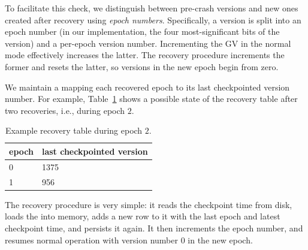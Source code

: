 To facilitate this check, we distinguish between pre-crash versions and new ones created after recovery using \emph{epoch numbers}. 
Specifically, a version is split into an epoch number (in our implementation, the four most-significant bits of the version) and a per-epoch version number. 
Incrementing the GV in the normal mode effectively increases the latter.
The recovery procedure increments the former and resets the latter, so 
versions in the new epoch begin from zero. 

We maintain a  mapping each recovered epoch to its last checkpointed version number. 
For example, Table~\ref{table:recovery} shows a possible state of the recovery table after two recoveries, i.e., during epoch $2$. 

\begin{table}[h]
\begin{center}
\begin{tabular}{ll}
epoch & last checkpointed version \\
\hline
0 & 1375\\
1 &  956\\
\end{tabular}
\end{center}
\caption{Example recovery table during epoch $2$.}
\label{table:recovery}
\end{table} 
 
The recovery procedure is very simple: it reads the checkpoint time from disk, loads the  into memory, adds a new row to it with the last epoch and latest checkpoint time, and persists it again. It then increments the epoch number, and resumes normal operation with version number $0$ in the new epoch.












